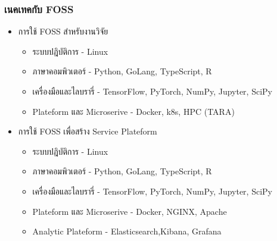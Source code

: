 \begin{frame} [t]
  \frametitle{เนคเทคกับ FOSS}

  \begin{itemize}
    \item การใช้ FOSS สำหรับงานวิจัย
          \begin{itemize}
            \item  ระบบปฎิบัติการ - Linux
            \item ภาษาคอมพิวเตอร์ - Python, GoLang, TypeScript, R
            \item เครื่องมือและไลบรารี่ - TensorFlow, PyTorch, NumPy, Jupyter, SciPy
            \item Plateform และ Microserive - Docker, k8s, HPC (TARA)
          \end{itemize}
    \item การใช้ FOSS เพื่อสร้าง Service Plateform
          \begin{itemize}
            \item  ระบบปฎิบัติการ - Linux
            \item ภาษาคอมพิวเตอร์ - Python, GoLang, TypeScript, R
            \item เครื่องมือและไลบรารี่ - TensorFlow, PyTorch, NumPy, Jupyter, SciPy
            \item Plateform และ Microserive - Docker, NGINX, Apache
            \item Analytic Plateform - Elasticsearch,Kibana, Grafana
          \end{itemize}
  \end{itemize}

\end{frame}